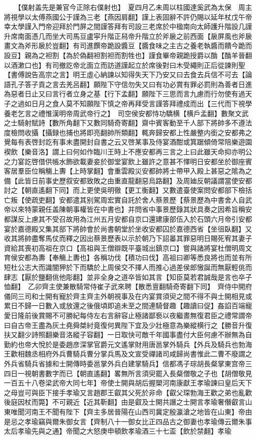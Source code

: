 　　【僕射盖先是兼官今正除右僕射也】　夏四月乙未周以柱國達奚武為太保　周主將視學以太傅燕國公于謹為三老【燕因肩翻】謹上表固辭不許仍賜以延年杖戊午帝幸太學謹入門帝迎拜於門屏之間謹答拜有司設三老席於中楹南向太師護升階設几謹升席南面憑几而坐大司馬豆盧寜升階正舄帝升階立於斧扆之前西面【扆屏風也斧扆畫文為斧形扆於豈翻】有司進饌帝跪設醬豆【醬食味之主古之養老執醬而饋今跪而設豆】親為之袒割【為於偽翻袒割袒而割牲也】謹食畢帝親跪授爵以酳【酳羊晉翻以酒漱口也】有司撤訖帝北面立而訪道謹起立於席後對曰木受繩則正后從諫則聖【書傅說告高宗之言】明王虛心納諫以知得失天下乃安又曰去食去兵信不可去【論語孔子答子貢之言去羌呂翻】願陛下守信勿失又曰有功必賞有罪必罰則為善者日進為惡者日止又曰言行者立身之基【行下孟翻】願陛下三思而言九慮而行勿使有過天子之過如日月之食人莫不知願陛下慎之帝再拜受言謹答拜禮成而出【三代而下視學養老乞言之禮惟漢明帝周武帝行之】　司空侯安都恃功驕横【横戶孟翻】數聚文武之士騎射賦詩【數所角翻下又數同騎奇寄翻】齋中賓客動至千人部下將帥多不遵法度檢問收攝【攝録也捕也將即亮翻帥所類翻】輒奔歸安都上性嚴整内銜之安都弗之覺每有表啓封訖有事未盡開封自書之云又啓某事及侍宴酒酣或箕踞傾倚常陪樂遊園褉飲【樂音洛】謂上曰何如作臨川王時上不應安都再三言之上曰此雖天命抑亦明公之力宴訖啓借供帳水飾欲載妻妾於御堂宴飲上雖許之意甚不懌明日安都坐於御座賓客居羣臣位稱觴上夀【上時掌翻】會重雲殿災安都帥將士帶甲入殿上甚惡之隂為之備【此皆日前事史歷叙安都致敗之由重直龍翻惡烏路翻】及周廸反朝議謂當使安都討之【朝直遙翻下同】而上更使吳明徹【更工衡翻】又數遣臺使案問安都部下檢括亡叛【使疏吏翻】安都遣其别駕周宏實自託於舍人蔡景歷【蔡景歷為中書舍人自武帝以來特蒙親任盖陳朝事權皆在中書也】并問省中事景歷錄其狀具奏之因希旨稱安都謀反上慮其不受召故用為江州五月安都自京口還建康部伍入於石頭六月帝引安都宴於嘉德殿又集其部下將帥會於尚書朝堂於坐收安都囚於嘉德西省【坐徂臥翻】又收其將帥盡奪馬仗而釋之因出蔡景歷表以示於朝乃下詔㬥其罪惡明日賜死宥其妻子資給其喪初高祖在京口【高祖與王僧辯既平臺城出鎮京口】嘗與諸將宴杜僧明周文育侯安都為夀【奉觴上夀也】各稱功伐【積功曰伐】高祖曰卿等悉良將也而並有所短杜公志大而識闇狎於下而驕於上周侯交不擇人而推心過差侯郎慠誕而無厭輕佻而肆志【厭於鹽翻佻他彫翻】並非全身之道卒皆如其言【知臣莫若君誠哉是言也卒子恤翻】　乙卯齊主使兼散騎常侍崔子武來聘【散悉亶翻騎奇寄翻下同】　齊侍中開府儀同三司和士開有寵於齊主齊主外朝視事及在内宴賞須臾之間不得不與士開相見或累日不歸一日數入或放還之後俄頃即追未至之間連騎督趣【趣讀曰促】姦諂百端寵愛日隆前後賞賜不可勝紀每侍左右言辭容止極諸鄙䙝以夜繼晝無復君臣之禮常謂帝曰自古帝王盡為灰土堯舜桀紂竟復何異陛下宜及少壯極意為樂縱横行之【勝音升復扶又翻少詩照翻樂音洛縱子容翻】一日取快可敵千年國事盡付大臣何慮不辦無為自勤約也帝大悅於是委趙彦深掌官爵元文遙掌財用唐邕掌外騎兵【外兵及騎兵也勃海王歡相魏丞相府外兵曹騎兵曹分掌兵馬及文宣受禪諸司咸歸尚書惟此二曹不廢謂之外兵省騎兵省據和士開傳時委邕掌外兵白建掌騎兵】信都馮子琮胡長粲掌東宫帝三四日一視朝書數字而已【朝直遙翻】畧無所言須臾罷入長粲僧敬之子也【胡僧敬見一百五十八卷梁武帝大同七年】帝使士開與胡后握槊河南康獻王孝瑜諫曰皇后天下之母豈可與臣下接手孝瑜又言趙郡王叡其父死於非命【叡父琛勃海王歡之弟也亂歡後庭因杖而斃】不可親近【近其靳翻】由是叡及士開共譖之士開言孝瑜奢僭叡言山東唯聞河南王不聞有陛下【齊主多居晉陽在山西司冀定殷瀛滄之地皆在山東】帝由是忌之孝瑜竊與爾朱御女言【齊制八十一御女比正四品古之御妻也孝瑜傳云爾朱事太后孝瑜先與之通】帝聞之大怒庚申頓飲孝瑜酒三十七盃【飲於禁翻】孝瑜